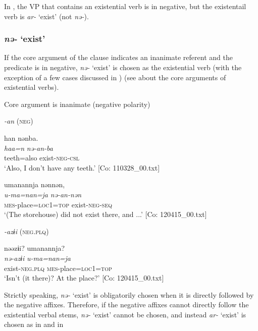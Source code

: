 In , the VP that contains an existential verb is in negative, but the existentail verb is \textit{ar-} ‘exist’ (not \textit{nə-}).

\subsubsection{\textit{nə-} ‘exist’}

If the core argument of the clause indicates an inanimate referent and the predicate is in negative, \textit{nə-} ‘exist’ is chosen as the existential verb (with the exception of a few cases discussed in ) (see  about the core arguments of existential verbs).

\ea\label{ex:8-34}
  Core argument is inanimate (negative polarity)

  \textit{-an} (\textsc{neg})


{\TM}
\glll  han  nənba.\\
\textit{haa=n}  \textit{nə-an-ba}\\
teeth=also  exist-\textsc{neg}-\textsc{csl}\\
\glt ‘Also, I don’t have any teeth.’ [Co: 110328\_00.txt]

\ex
{\TM}
\glll  umanannja  nənnən,\\
\textit{u-ma=nan=ja}  \textit{nə-an-nən}\\
\textsc{mes}-place=\textsc{loc}1=\textsc{top}  exist-\textsc{neg}-\textsc{seq}\\
\glt ‘(The storehouse) did not exist there, and ...’ [Co: 120415\_00.txt]

  \textit{-azɨi} (\textsc{neg}.\textsc{plq})



{\TM}
\glll  nəəzɨi?  umanannja?\\
\textit{nə-azɨi}  \textit{u-ma=nan=ja}\\
exist-\textsc{neg}.\textsc{plq}  \textsc{mes}-place=\textsc{loc}1=\textsc{top}\\
\glt ‘Isn’t (it there)? At the place?’ [Co: 120415\_00.txt]
\z
\z

Strictly speaking, \textit{nə-} ‘exist’ is obligatorily chosen when it is directly followed by the negative affixes. Therefore, if the negative affixes cannot directly follow the existential verbal stems, \textit{nə-} ‘exist’ cannot be chosen, and instead \textit{ar-} ‘exist’ is chosen as in  and  in 

